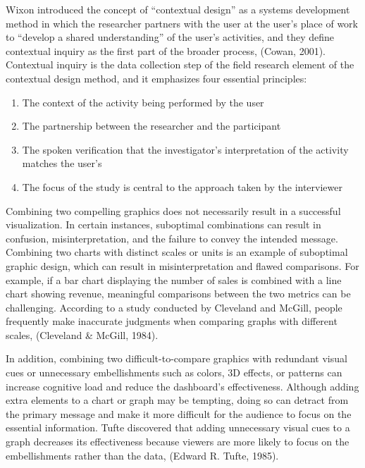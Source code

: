 \documentclass[print]{nuthesis}
\begin{document}
Wixon introduced the concept of ``contextual design'' as a systems development method in which the researcher partners with the user at the user's place of work to ``develop a shared understanding'' of the user's activities, and they define contextual inquiry as the first part of the broader process, (Cowan, 2001).
Contextual inquiry is the data collection step of the field research element of the contextual design method, and it emphasizes four essential principles:

\begin{enumerate}
\def\labelenumi{\arabic{enumi}.}
\item
  The context of the activity being performed by the user
\item
  The partnership between the researcher and the participant
\item
  The spoken verification that the investigator's interpretation of the activity matches the user's
\item
  The focus of the study is central to the approach taken by the interviewer
\end{enumerate}

Combining two compelling graphics does not necessarily result in a successful visualization.
In certain instances, suboptimal combinations can result in confusion, misinterpretation, and the failure to convey the intended message.
Combining two charts with distinct scales or units is an example of suboptimal graphic design, which can result in misinterpretation and flawed comparisons.
For example, if a bar chart displaying the number of sales is combined with a line chart showing revenue, meaningful comparisons between the two metrics can be challenging.
According to a study conducted by Cleveland and McGill, people frequently make inaccurate judgments when comparing graphs with different scales, (Cleveland \& McGill, 1984).

In addition, combining two difficult-to-compare graphics with redundant visual cues or unnecessary embellishments such as colors, 3D effects, or patterns can increase cognitive load and reduce the dashboard's effectiveness.
Although adding extra elements to a chart or graph may be tempting, doing so can detract from the primary message and make it more difficult for the audience to focus on the essential information.
Tufte discovered that adding unnecessary visual cues to a graph decreases its effectiveness because viewers are more likely to focus on the embellishments rather than the data, (Edward R. Tufte, 1985).
\end{document}

